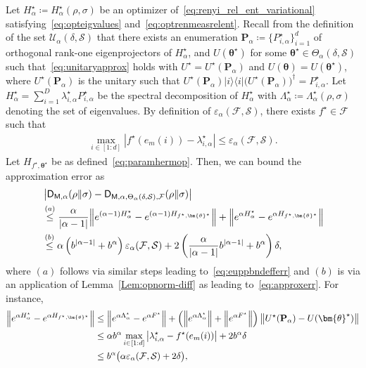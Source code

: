 \documentclass[a4paper,onecolumn,11pt,accepted=2026-05-12]{quantumarticle}
\newcommand{\bra}[1]{\langle#1|}
\newcommand{\ket}[1]{|#1\rangle}
\newcommand{\norm}[1]{\left\Vert#1\right\Vert}
\newcommand{\abs}[1]{\left\vert#1\right\vert}
\newcommand{\sD}{\mathsf{D}}
\newcommand{\cF}{\mathcal{F}}
\newcommand{\cS}{\mathcal{S}}
\newcommand{\cU}{\mathcal{U}}
\begin{document}
Let $H_{\alpha}^{\star} \coloneqq H_{\alpha}^{\star}(\rho,\sigma)$ be an optimizer of~\eqref{eq:renyi_rel_ent_variational} satisfying~\eqref{eq:opteigvalues} and~\eqref{eq:optrenmeasrelent}.  Recall from the definition of the set $\cU_{\alpha}(\delta,\cS)$ that there exists an enumeration $\mathbf{P}_{\alpha}\coloneqq\{P_{i,\alpha}^{\star}\}_{i=1}^d $ of  orthogonal rank-one eigenprojectors of $H_{\alpha}^{\star}$, 
and  $U(\bm{\theta}^{\star}) $ for some $\bm{\theta}^{\star} \in \Theta_{\alpha}(\delta,\cS)$ such that~\eqref{eq:unitaryapprox} holds with $U^{\star}=U^{\star}(\mathbf{P}_{\alpha})$ and $U(\bm{\theta})=U(\bm{\theta}^{\star})$, where $U^{\star}(\mathbf{P}_{\alpha})$ is the unitary such that  $U^{\star}(\mathbf{P}_{\alpha})\ket{i}\!\bra{i}(U^{\star}(\mathbf{P}_{\alpha})\big)^{\dag}=P_{i,\alpha}^{\star}$.  Let $H_{\alpha}^{\star}=\sum_{i=1}^D \lambda_{i,\alpha}^{\star} P_{i,\alpha}^{\star}$ be the spectral decomposition of $H_{\alpha}^{\star}$ with $\Lambda_{\alpha}^{\star}\coloneqq \Lambda_{\alpha}^{\star}(\rho,\sigma)$ denoting the set of eigenvalues. By definition of $\varepsilon_{\alpha}(\cF,\cS)$,  there exists $f^{\star} \in \cF$ such that
\begin{align}
    \max_{i \in [1:d]} \abs{f^{\star}(e_m(i))-\lambda_{i,\alpha}^{\star}} \leq \varepsilon_{\alpha}(\cF,\cS).\label{eq:apprcnnren}
\end{align} 
  Let   
$H_{f^{\star},\bm{\theta}^{\star}}$ be as defined~\eqref{eq:paramhermop}. 
Then,  we can bound the approximation error as 
\begin{align}
&\abs{\sD_{\mathsf{M,\alpha}}(\rho\Vert\sigma) -\sD_{\mathsf{M,\alpha},\Theta_{\alpha}(\delta,\cS),\cF}(\rho\Vert\sigma)} \notag \\
& \stackrel{(a)}{\leq} \frac{\alpha}{\abs{\alpha-1}}\Big\|e^{(\alpha-1)H_{\alpha}^{\star}}-e^{(\alpha-1)H_{f^{\star},\bm{\theta}^{\star}}}\Big\|+\Big\|e^{\alpha H_{\alpha}^{\star}}-e^{\alpha H_{f^{\star},\bm{\theta}^{\star}}}\Big\| \notag \\
& \stackrel{(b)}{\leq} \alpha \left(b^{\abs{\alpha-1}}+b^{\alpha}\right) \varepsilon_{\alpha}(\cF,\cS) +2\left(\frac{\alpha}{\abs{\alpha-1}} b^{\abs{\alpha-1}}+b^{\alpha}\right)\delta, \label{eq:approxbnd-Renyi}
\end{align}
where $(a)$ follows via similar steps  leading to~\eqref{eq:euppbndefferr} and $(b)$ is via an application of Lemma~\ref{Lem:opnorm-diff} as leading to~\eqref{eq:approxerr}. For instance,  
\begin{align}
   \norm{e^{\alpha H_{\alpha}^{\star}}-e^{\alpha 
H_{f^{\star},\bm{\theta}^{\star}}}} 
&\leq \norm{e^{\alpha \Lambda_{\alpha}^{\star}}-e^{\alpha 
 F^{\star}}} + \left(\norm{e^{\alpha \Lambda_{\alpha}^{\star}}}+\norm{e^{\alpha 
 F^{\star}}}\right) \norm{U^{\star}(\mathbf{P}_{\alpha})-U(\bm{\theta}^{\star})}\notag \\
 & \leq \alpha  b^{\alpha} \max_{i \in [1:d]} \abs{\lambda_{i,\alpha}^{\star}- f^{\star}\!\left(e_m(i)\right)} + 2 b^{\alpha} \delta\notag \\
 & \leq  b^{\alpha} \big(\alpha \varepsilon_{\alpha}(\cF,\cS) + 2\delta\big), \notag
\end{align}
\end{document}

